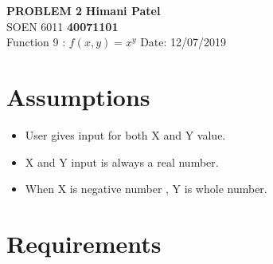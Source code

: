 \documentclass[a4paper, 11pt]{article}
\begin{document}
\noindent
\large\textbf{PROBLEM 2} \hfill \textbf{Himani Patel} \\
\normalsize SOEN 6011 \hfill \textbf{40071101} \\
Function 9 :  $f(x,y)= x^y$  \hfill Date: 12/07/2019 \\

\section{Assumptions}
\begin{itemize}
    \item User gives input for both X and Y value.
    \item X and Y input is always a real number.
    \item When X is negative number , Y is whole number.\\
\end{itemize}

   


\section{Requirements}
\end{document}
